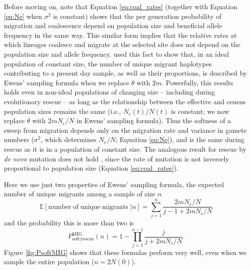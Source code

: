 \documentclass[]{article}
\begin{document}
Before moving on, note that Equation \ref{eq:coal_rates} (together with Equation \ref{eq:Ne} when $\sigma^2$ is constant) shows that the per generation probability of migration and coalescence depend on population size and beneficial allele frequency in the same way. 
This similar form implies that the relative rates at which lineages coalesce and migrate at the selected site does not depend on the population size and allele frequency. 
\cite{pennings2006soft2} used this fact to show that, in an ideal population of constant size, the number of unique migrant haplotypes contributing to a present day sample, as well as their proportions, is described by Ewens' sampling formula \citep[pages 334\textit{ff} in][]{ewens2004mathematical} when we replace $\theta$ with $2 m$. 
Powerfully, this results holds even in non-ideal populations of changing size \citep[as briefly noted by][p.\ 1081-1082]{pennings2006soft2} -- including during evolutionary rescue -- as long as the relationship between the effective and census population sizes remains the same (i.e., $N_e(t)/N(t)$ is constant; we now replace $\theta$ with $2m N_e/N$ in Ewens' sampling formula). 
Thus the softness of a sweep from migration depends only on the migration rate and variance in gamete numbers ($\sigma^2$, which determines $N_e/N$; Equation \ref{eq:Ne}), and is the same during rescue as it is in a population of constant size.
The analogous result for rescue by \textit{de novo} mutation does not hold \citep[as it does for a population of constant size,][]{pennings2006soft2}, since the rate of mutation is not inversely proportional to population size (Equation \ref{eq:coal_rates}).  

Here we use just two properties of Ewens' sampling formula, the expected number of unique migrants among a sample of size $n$ \citep[page 336 in][]{ewens2004mathematical}
\begin{equation}\label{eq:ewens_number}
\mathbb{E}[\mathrm{number\; of\; unique\; migrants\;} | n] = \sum_{j=1}^n \frac{2 m N_e/N}{j - 1 + 2 m N_e/N}
\end{equation}
and the probability this is more than two is \citep[equation 10.9 in][]{ewens2004mathematical}
\begin{equation}\label{eq:ewens_Psoft}
P_{\mathrm{soft}|\mathrm{rescue}}^\mathrm{MIG}(n) = 1 - \prod_{j=1}^{n-1} \frac{j}{j + 2 m N_e/N}.
\end{equation}
Figure \ref{fig:PsoftMIG} shows that these formulas perform very well, even when we sample the entire population ($n=2N(0)$).
\end{document}
